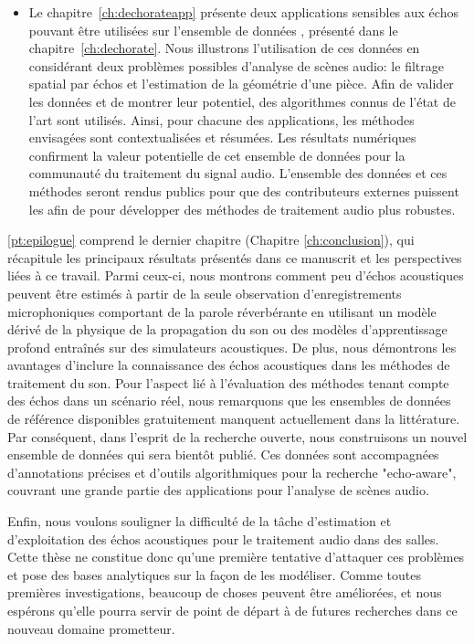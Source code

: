 \begin{itemize}
    \item
    Le chapitre~\ref{ch:dechorateapp} présente deux applications sensibles aux échos pouvant être utilisées sur l'ensemble de données \dEchorate, présenté dans le chapitre~\ref{ch:dechorate}.
    Nous illustrons l'utilisation de ces données en considérant deux problèmes possibles d'analyse de scènes audio:
    le filtrage spatial par échos et l'estimation de la géométrie d'une pièce.
    Afin de valider les données et de montrer leur potentiel, des algorithmes connus de l'état de l'art sont utilisés.
    Ainsi, pour chacune des applications, les méthodes envisagées sont contextualisées et résumées.
    Les résultats numériques confirment la valeur potentielle de cet ensemble de données pour la communauté du traitement du signal audio.
    L'ensemble des données et ces méthodes seront rendus publics pour que des contributeurs externes puissent les afin de pour développer des méthodes de traitement audio plus robustes.
\end{itemize}

\ref{pt:epilogue} comprend le dernier chapitre (Chapitre \ref{ch:conclusion}), qui récapitule les principaux résultats présentés dans ce manuscrit et les perspectives liées à ce travail.
Parmi ceux-ci, nous montrons comment peu d'échos acoustiques peuvent être estimés à partir de la seule observation d'enregistrements microphoniques comportant de la parole réverbérante en utilisant un modèle dérivé de la physique de la propagation du son ou des modèles d'apprentissage profond entraînés sur des simulateurs acoustiques.
De plus, nous démontrons les avantages d'inclure la connaissance des échos acoustiques dans les méthodes de traitement du son.
Pour l'aspect lié à l'évaluation des méthodes tenant compte des échos dans un scénario réel, nous remarquons que les ensembles de données de référence disponibles gratuitement manquent actuellement dans la littérature.
Par conséquent, dans l'esprit de la recherche ouverte, nous construisons un nouvel ensemble de données qui sera bientôt publié.
Ces données sont accompagnées d'annotations précises et d'outils algorithmiques pour la recherche "echo-aware", couvrant une grande partie des applications pour l'analyse de scènes audio.

\mynewline
Enfin, nous voulons souligner la difficulté de la tâche d'estimation et d'exploitation des échos acoustiques pour le traitement audio dans des salles.
Cette thèse ne constitue donc qu'une première tentative d'attaquer ces problèmes et pose des bases analytiques sur la façon de les modéliser.
Comme toutes premières investigations, beaucoup de choses peuvent être améliorées, et nous espérons qu'elle pourra servir de point de départ à de futures recherches dans ce nouveau domaine prometteur.